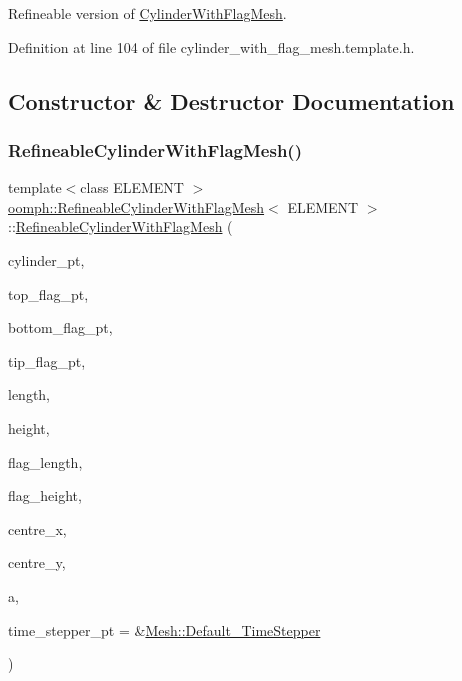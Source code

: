 Refineable version of \hyperlink{classoomph_1_1CylinderWithFlagMesh}{Cylinder\+With\+Flag\+Mesh}. 

Definition at line 104 of file cylinder\+\_\+with\+\_\+flag\+\_\+mesh.\+template.\+h.



\subsection{Constructor \& Destructor Documentation}
\mbox{\label{classoomph_1_1RefineableCylinderWithFlagMesh_ab5cca3144d26422aecc5aa709e8f1ff9}} 
\subsubsection{\texorpdfstring{Refineable\+Cylinder\+With\+Flag\+Mesh()}{RefineableCylinderWithFlagMesh()}}
{\footnotesize\ttfamily template$<$class E\+L\+E\+M\+E\+NT $>$ \\
\hyperlink{classoomph_1_1RefineableCylinderWithFlagMesh}{oomph\+::\+Refineable\+Cylinder\+With\+Flag\+Mesh}$<$ E\+L\+E\+M\+E\+NT $>$\+::\hyperlink{classoomph_1_1RefineableCylinderWithFlagMesh}{Refineable\+Cylinder\+With\+Flag\+Mesh} (\begin{DoxyParamCaption}\item[{\hyperlink{classoomph_1_1Circle}{Circle} $\ast$}]{cylinder\+\_\+pt,  }\item[{\hyperlink{classoomph_1_1GeomObject}{Geom\+Object} $\ast$}]{top\+\_\+flag\+\_\+pt,  }\item[{\hyperlink{classoomph_1_1GeomObject}{Geom\+Object} $\ast$}]{bottom\+\_\+flag\+\_\+pt,  }\item[{\hyperlink{classoomph_1_1GeomObject}{Geom\+Object} $\ast$}]{tip\+\_\+flag\+\_\+pt,  }\item[{const double \&}]{length,  }\item[{const double \&}]{height,  }\item[{const double \&}]{flag\+\_\+length,  }\item[{const double \&}]{flag\+\_\+height,  }\item[{const double \&}]{centre\+\_\+x,  }\item[{const double \&}]{centre\+\_\+y,  }\item[{const double \&}]{a,  }\item[{\hyperlink{classoomph_1_1TimeStepper}{Time\+Stepper} $\ast$}]{time\+\_\+stepper\+\_\+pt = {\ttfamily \&\hyperlink{classoomph_1_1Mesh_a12243d0fee2b1fcee729ee5a4777ea10}{Mesh\+::\+Default\+\_\+\+Time\+Stepper}} }\end{DoxyParamCaption})\hspace{0.3cm}{\ttfamily [inline]}}



